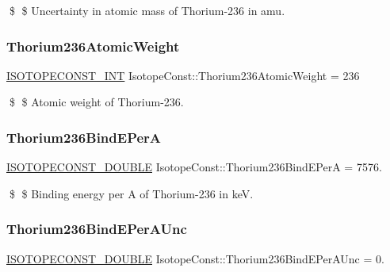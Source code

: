 \$ \$ Uncertainty in atomic mass of Thorium-\/236 in amu. \mbox{\label{group___isotope_const-_thorium-_th236_ga8338cb40d5db219d43241ceece0974d4}} 
\subsubsection{\texorpdfstring{Thorium236\+Atomic\+Weight}{Thorium236AtomicWeight}}
{\footnotesize\ttfamily \mbox{\hyperlink{group___isotope_const-_macros_ga5f18360b3e99483a35c32d789e62621c}{I\+S\+O\+T\+O\+P\+E\+C\+O\+N\+S\+T\+\_\+\+I\+NT}} Isotope\+Const\+::\+Thorium236\+Atomic\+Weight = 236}

\$ \$ Atomic weight of Thorium-\/236. \mbox{\label{group___isotope_const-_thorium-_th236_ga950d1c797a6df03d88bff36d3b6d4167}} 
\subsubsection{\texorpdfstring{Thorium236\+Bind\+E\+PerA}{Thorium236BindEPerA}}
{\footnotesize\ttfamily \mbox{\hyperlink{group___isotope_const-_macros_ga8f45a7272ce02c0b4c65c44636ed719a}{I\+S\+O\+T\+O\+P\+E\+C\+O\+N\+S\+T\+\_\+\+D\+O\+U\+B\+LE}} Isotope\+Const\+::\+Thorium236\+Bind\+E\+PerA = 7576.}

\$ \$ Binding energy per A of Thorium-\/236 in keV. \mbox{\label{group___isotope_const-_thorium-_th236_ga3e9a169f13a0b5f1d14e7b9478aeb554}} 
\subsubsection{\texorpdfstring{Thorium236\+Bind\+E\+Per\+A\+Unc}{Thorium236BindEPerAUnc}}
{\footnotesize\ttfamily \mbox{\hyperlink{group___isotope_const-_macros_ga8f45a7272ce02c0b4c65c44636ed719a}{I\+S\+O\+T\+O\+P\+E\+C\+O\+N\+S\+T\+\_\+\+D\+O\+U\+B\+LE}} Isotope\+Const\+::\+Thorium236\+Bind\+E\+Per\+A\+Unc = 0.}


